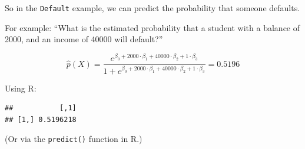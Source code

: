 \documentclass[
  10pt,
  ignorenonframetext,
]{beamer}
\newenvironment{Shaded}{\begin{snugshade}}{\end{snugshade}}
\newcommand{\DecValTok}[1]{\textcolor[rgb]{0.00,0.00,0.81}{#1}}
\newcommand{\FunctionTok}[1]{\textcolor[rgb]{0.13,0.29,0.53}{\textbf{#1}}}
\newcommand{\NormalTok}[1]{#1}
\newcommand{\OtherTok}[1]{\textcolor[rgb]{0.56,0.35,0.01}{#1}}
\newcommand{\SpecialCharTok}[1]{\textcolor[rgb]{0.81,0.36,0.00}{\textbf{#1}}}
\begin{document}
\begin{frame}[fragile]
So in the \texttt{Default} example, we can predict the probability that
someone defaults.

For example: ``What is the estimated probability that a student with a
balance of 2000, and an income of 40000 will default?''

\[\hat{p}(X) = \frac{e^{\beta_0 + 2000 \cdot \beta_1 + 40000 \cdot \beta_2 + 1 \cdot \beta_3}}{ 1+  e^{\beta_0 + 2000 \cdot \beta_1 + 40000 \cdot \beta_2 + 1 \cdot \beta_3}} = 0.5196\]
\vspace{6mm}

Using R: \scriptsize

\begin{Shaded}
\end{Shaded}

\begin{verbatim}
##           [,1]
## [1,] 0.5196218
\end{verbatim}

\normalsize

(Or via the \texttt{predict()} function in R.)
\end{frame}
\end{document}
